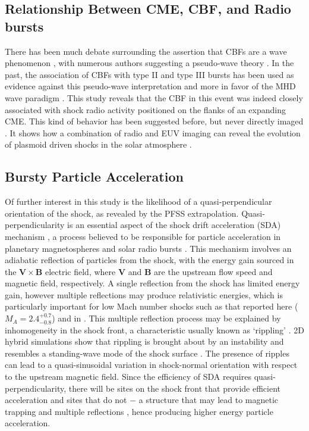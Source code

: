 \subsection{Relationship Between CME, CBF, and Radio bursts}\label{sec:31}

There has been much debate surrounding the assertion that CBFs are a wave phenomenon \citep{gallagher2011}, with numerous authors suggesting a pseudo-wave theory \citep{delannee2008}. In the past, the association of CBFs with type II and type III bursts has been used as evidence against this pseudo-wave interpretation and more in favor of the MHD wave paradigm \citep{warmuth2004b, grechnev2011}. This study reveals that the CBF in this event was indeed closely associated with shock radio activity positioned on the flanks of an expanding CME. This kind of behavior has been suggested before, but never directly imaged \citep{kozarev2011, feng2012, feng2013}. It shows how a combination of radio and EUV imaging can reveal the evolution of plasmoid driven shocks in the solar atmosphere \citep{bain2012}.

\subsection{Bursty Particle Acceleration}

Of further interest in this study is the likelihood of a quasi-perpendicular orientation of the shock, as revealed by the PFSS extrapolation. 
Quasi-perpendicularity is an essential aspect of the shock drift acceleration (SDA) mechanism \citep{ball2001}, a process believed to be responsible for particle acceleration in planetary magnetospheres \citep{wu1984} and solar radio bursts \citep{holman1983}.
This mechanism involves an adiabatic reflection of particles from the shock, with the energy gain sourced in the $\mathbf{V} \times \mathbf{B}$ electric field, where $\mathbf{V}$ and $\mathbf{B}$ are the upstream flow speed and magnetic field, respectively. A single reflection from the shock has limited energy gain, however multiple reflections may produce relativistic energies, which is particularly important for low Mach number shocks such as that reported here ($M_A =2.4^{+0.7}_{-0.8}$) and in \citep{guo2012}. This multiple reflection process may be explained by inhomogeneity in the shock front, a characteristic usually known as \textquoteleft rippling' \citep{zlobec1993, vandas2011}. 2D hybrid simulations show that rippling is brought about by an instability \citep{burgess2006} and resembles a standing-wave mode of the shock surface \citep{lowe2003}. The presence of ripples can lead to a quasi-sinusoidal variation in shock-normal orientation with respect to the upstream magnetic field. Since the efficiency of SDA requires quasi-perpendicularity, there will be sites on the shock front that provide efficient acceleration and sites that do not $-$ a structure that may lead to magnetic trapping and multiple reflections \citep{zlobec1993}, hence producing higher energy particle acceleration. 

